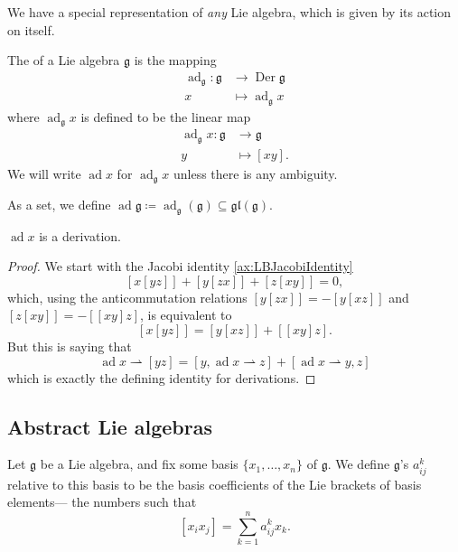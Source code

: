 \documentclass{article}
\newcommand{\lb}[1]{\ensuremath{\left[{#1}\right]}}
\DeclareMathOperator{\Der}{Der}
\DeclareMathOperator{\ad}{ad}
\newcommand*\frkg{{\ensuremath{\mathfrak{g}}}}
\newcommand*\glalg{\ensuremath{\mathfrak{gl}}}
\begin{document}
We have a special representation of \textit{any} Lie algebra, which is given by its action on itself.

\begin{definition}
    The  of a Lie algebra $\frkg$ is the mapping
    \begin{align*}
        \ad_\frkg:
        \frkg 
        &\to
        \Der \frkg
        \\
        x 
        &\mapsto 
        \ad_\frkg x
    \end{align*}
    where $\ad_\frkg x$ is defined to be the linear map
    \begin{align*}
        \ad_\frkg x: 
        \frkg 
        &\to 
        \frkg \\
        y 
        &\mapsto
        \lb{xy}.
    \end{align*}
    We will write $\ad x$ for $\ad_\frkg x$ unless there is any ambiguity.

    As a set, we define $\ad \frkg \coloneq \ad_\frkg(\frkg) \subseteq \glalg(\frkg)$.
\end{definition}

\begin{proposition}
    $\ad x$ is a derivation.
\end{proposition}
\begin{proof}
    We start with the Jacobi identity \ref{ax:LBJacobiIdentity}
    \[
        \lb{x\lb{yz}} + \lb{y\lb{zx}} + \lb{z\lb{xy}}
        =
        0,
    \]
    which, using the anticommutation relations $\lb{y\lb{zx}} = -\lb{y\lb{xz}}$ and $\lb{z\lb{xy}} = -\lb{\lb{xy}z}$, is equivalent to
    \[
        \lb{x\lb{yz}}
        =
        \lb{y\lb{xz}} + \lb{\lb{xy}{z}}.
    \]
    But this is saying that
    \[
        \ad x \rightharpoonup \lb{yz}
        =
        \lb{y, \ad x \rightharpoonup z}
        +
        \lb{\ad x \rightharpoonup y, z}
    \]
    which is exactly the defining identity for derivations.
\end{proof}


\subsection{Abstract Lie algebras}

\begin{definition}
    Let $\frkg$ be a Lie algebra, and fix some basis $\{x_1,\ldots,x_n\}$ of $\frkg$.
    We define $\frkg$'s  $a^k_{ij}$ relative to this basis to be the basis coefficients of the Lie brackets of basis elements--- the numbers such that
    \[
        \lb{x_ix_j}
        =
        \sum_{k=1}^n
        a^k_{ij}
        x_k.
    \]
\end{definition}
\end{document}

